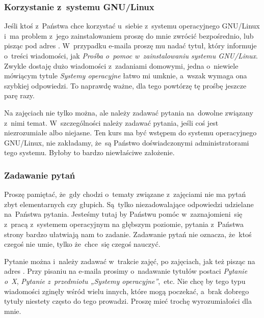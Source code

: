 \documentclass[10pt,t]{beamer}
\begin{document}
\begin{frame}
  \frametitle{Korzystanie z~systemu GNU/Linux}


  Jeśli ktoś z~Państwa chce korzystać u~siebie z~systemu operacyjnego
  GNU/Linux i~ma problem z~jego zainstalowaniem proszę do mnie zwrócić
  bezpośrednio, lub pisząc pod adres \email. W~przypadku e-maila proszę mu
  nadać tytuł, który informuje o~treści wiadomości, jak
  \textit{Prośba o~pomoc w~zainstalowaniu systemu GNU/Linux}. Zwykle
  dostaję dużo wiadomości z~zadaniami domowymi, jedna o~niewiele mówiącym
  tytule \textit{Systemy operacyjne} łatwo mi umknie, a~wszak wymaga ona
  szybkiej odpowiedzi. To naprawdę ważne, dla tego powtórzę tę prośbę
  jeszcze parę razy.

  Na zajęciach nie tylko można, ale \alert{należy} zadawać pytania
  na~dowolne związany z~nimi temat. W~szczególności \alert{należy} zadawać
  pytania, jeśli coś jest niezrozumiałe albo niejasne. Ten kurs ma być
  wstępem do systemu operacyjnego GNU/Linux, \alert{nie} zakładamy, że~są
  Państwo doświadczonymi administratorami tego systemu. Byłoby to bardzo
  niewłaściwe założenie.

\end{frame}





\begin{frame}
  \frametitle{Zadawanie pytań}


  Proszę pamiętać, że~gdy chodzi o~tematy związane z~zajęciami \alert{nie}
  ma pytań zbyt elementarnych czy głupich. Są~tylko niezadowalające
  odpowiedzi udzielane na~Państwa pytania. Jesteśmy tutaj by Państwu pomóc
  w~zaznajomieni~się z~pracą z~systemem operacyjnym na głębszym poziomie,
  pytania z~Państwa strony bardzo ułatwiają nam to zadanie. Zadawanie pytań
  nie oznacza, że~ktoś czegoś nie umie, tylko że~chce~się czegoś nauczyć.

  Pytanie można i~\alert{należy} zadawać w~trakcie zajęć, po zajęciach, jak
  też pisząc na adres \email. Przy pisaniu na e-maila prosimy o~nadawanie
  tytułów postaci \textit{Pytanie o~X}, \textit{Pytanie z~przedmiotu
    „Systemy operacyjne”},~etc. Nie chcę by tego typu wiadomości zginęły
  wśród wielu innych, które mogą poczekać, a~brak dobrego tytuły niestety
  często do tego prowadzi. Proszę mieć trochę wyrozumiałości dla mnie.

\end{frame}
\end{document}
